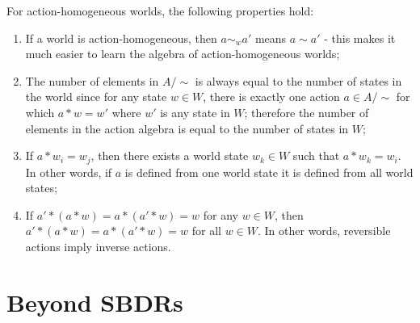 For action-homogeneous worlds, the following properties hold:
\begin{enumerate}
	\item If a world is action-homogeneous, then $a \sim_{w} a'$ means $a \sim a'$ - this makes it much easier to learn the algebra of action-homogeneous worlds;

	\item The number of elements in $A/\sim$ is always equal to the number of states in the world since for any state $w \in W$, there is exactly one action $a \in A/\sim$ for which $a * w = w'$ where $w'$ is any state in $W$; therefore the number of elements in the action algebra is equal to the number of states in $W$;

	\item If $a * w_{i} = w_{j}$, then there exists a world state $w_{k} \in W$ such that $a * w_{k} = w_{i}$.
	      In other words, if $a$ is defined from one world state it is defined from all world states;

	\item If $a' * (a * w) = a * (a' * w) = w$ for any $w \in W$, then $a' * (a * w) = a * (a' * w) = w$ for all $w \in W$.
	      In other words, reversible actions imply inverse actions.
\end{enumerate}


\section{Beyond SBDRs}\label{sec:Beyond SBDRs}

